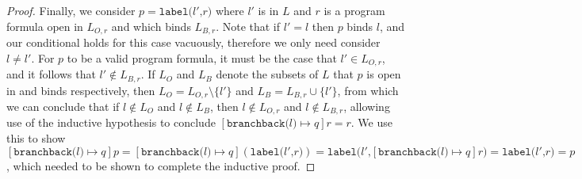 \documentclass[11pt]{article}
\begin{document}
\begin{proof}
Finally, we consider $p = \texttt{label(}l'\texttt{,} r\texttt{)}$ where $l'$ is in $L$ and $r$ is a program formula open in $L_{O,r}$ and which binds $L_{B,r}$.  Note that if $l' = l$ then $p$ binds $l$, and our conditional holds for this case vacuously, therefore we only need consider $l \neq l'$.  For $p$ to be a valid program formula, it must be the case that $l' \in L_{O,r}$, and it follows that $l' \notin L_{B,r}$.  If $L_{O}$ and $L_{B}$ denote the subsets of $L$ that $p$ is open in and binds respectively, then $L_{O} = L_{O,r} \setminus \{l'\}$ and $L_{B} = L_{B,r} \cup \{l'\}$, from which we can conclude that if $l \notin L_{O}$ and $l \notin L_{B}$, then $l \notin L_{O,r}$ and $l \notin L_{B,r}$, allowing use of the inductive hypothesis to conclude $[\texttt{branchback(}l\texttt{)} \mapsto q]r = r$.  We use this to show $[\texttt{branchback(}l\texttt{)} \mapsto q]p = [\texttt{branchback(}l\texttt{)} \mapsto q](\texttt{label(}l'\texttt{,} r\texttt{)}) = \texttt{label(}l'\texttt{,} [\texttt{branchback(}l\texttt{)} \mapsto q]r\texttt{)} = \texttt{label(}l'\texttt{,} r\texttt{)} = p$, which needed to be shown to complete the inductive proof.
\end{proof}
\end{document}
